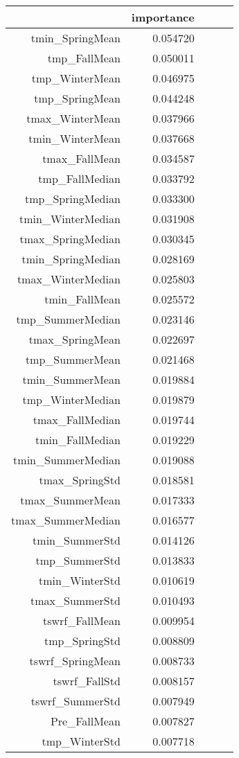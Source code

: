 \begin{tabular}{rrrrr}
\toprule
 & importance \\
\midrule
tmin_SpringMean & 0.054720 \\
tmp_FallMean & 0.050011 \\
tmp_WinterMean & 0.046975 \\
tmp_SpringMean & 0.044248 \\
tmax_WinterMean & 0.037966 \\
tmin_WinterMean & 0.037668 \\
tmax_FallMean & 0.034587 \\
tmp_FallMedian & 0.033792 \\
tmp_SpringMedian & 0.033300 \\
tmin_WinterMedian & 0.031908 \\
tmax_SpringMedian & 0.030345 \\
tmin_SpringMedian & 0.028169 \\
tmax_WinterMedian & 0.025803 \\
tmin_FallMean & 0.025572 \\
tmp_SummerMedian & 0.023146 \\
tmax_SpringMean & 0.022697 \\
tmp_SummerMean & 0.021468 \\
tmin_SummerMean & 0.019884 \\
tmp_WinterMedian & 0.019879 \\
tmax_FallMedian & 0.019744 \\
tmin_FallMedian & 0.019229 \\
tmin_SummerMedian & 0.019088 \\
tmax_SpringStd & 0.018581 \\
tmax_SummerMean & 0.017333 \\
tmax_SummerMedian & 0.016577 \\
tmin_SummerStd & 0.014126 \\
tmp_SummerStd & 0.013833 \\
tmin_WinterStd & 0.010619 \\
tmax_SummerStd & 0.010493 \\
tswrf_FallMean & 0.009954 \\
tmp_SpringStd & 0.008809 \\
tswrf_SpringMean & 0.008733 \\
tswrf_FallStd & 0.008157 \\
tswrf_SummerStd & 0.007949 \\
Pre_FallMean & 0.007827 \\
tmp_WinterStd & 0.007718 \\

\end{tabular}
